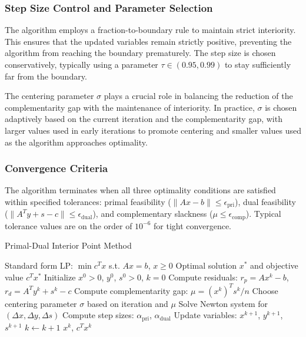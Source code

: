 \subsubsection{Step Size Control and Parameter Selection}

The algorithm employs a fraction-to-boundary rule to maintain strict interiority. This ensures that the updated variables remain strictly positive, preventing the algorithm from reaching the boundary prematurely. The step size is chosen conservatively, typically using a parameter $\tau \in (0.95, 0.99)$ to stay sufficiently far from the boundary.

The centering parameter $\sigma$ plays a crucial role in balancing the reduction of the complementarity gap with the maintenance of interiority. In practice, $\sigma$ is chosen adaptively based on the current iteration and the complementarity gap, with larger values used in early iterations to promote centering and smaller values used as the algorithm approaches optimality.

\subsubsection{Convergence Criteria}

The algorithm terminates when all three optimality conditions are satisfied within specified tolerances: primal feasibility ($\|Ax - b\| \leq \epsilon_{\text{pri}}$), dual feasibility ($\|A^T y + s - c\| \leq \epsilon_{\text{dual}}$), and complementary slackness ($\mu \leq \epsilon_{\text{comp}}$). Typical tolerance values are on the order of $10^{-6}$ for tight convergence.

\begin{algorithm}[H]
\caption{Primal-Dual Interior Point Method}
\begin{algorithmic}[1]
\REQUIRE Standard form LP: $\min c^T x$ s.t. $Ax = b$, $x \geq 0$
\ENSURE Optimal solution $x^*$ and objective value $c^T x^*$
\STATE Initialize $x^0 > 0$, $y^0$, $s^0 > 0$, $k = 0$
    \STATE Compute residuals: $r_p = Ax^k - b$, $r_d = A^T y^k + s^k - c$
    \STATE Compute complementarity gap: $\mu = (x^k)^T s^k / n$
    \STATE Choose centering parameter $\sigma$ based on iteration and $\mu$
    \STATE Solve Newton system for $(\Delta x, \Delta y, \Delta s)$
    \STATE Compute step sizes: $\alpha_{\text{pri}}$, $\alpha_{\text{dual}}$
    \STATE Update variables: $x^{k+1}$, $y^{k+1}$, $s^{k+1}$
    \STATE $k \leftarrow k + 1$
\ENDWHILE
\RETURN $x^k$, $c^T x^k$
\end{algorithmic}
\end{algorithm}
